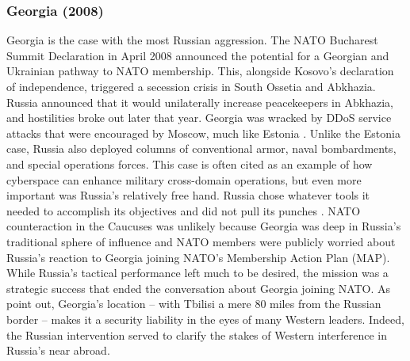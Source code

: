 \documentclass[11pt,letterpaper,pdftex,dvipsnames,table]{article}
\begin{document}
\subsubsection{Georgia (2008)}
Georgia is the case with the most Russian aggression. The NATO Bucharest Summit Declaration in April 2008 announced the potential for a Georgian and Ukrainian pathway to NATO membership. This, alongside Kosovo's declaration of independence, triggered a secession crisis in South Ossetia and Abkhazia. Russia announced that it would unilaterally increase peacekeepers in Abkhazia, and hostilities broke out later that year. Georgia was wracked by DDoS service attacks that were encouraged by Moscow, much like Estonia \citep{deibert_cyclonescyberspaceinformation_2012}. Unlike the Estonia case, Russia also deployed columns of conventional armor, naval bombardments, and special operations forces. This case is often cited as an example of how cyberspace can enhance military cross-domain operations, but even more important was Russia's relatively free hand. Russia chose whatever tools it needed to accomplish its objectives and did not pull its punches \citep{binnendijk_understandingrussianblack_2020}. NATO counteraction in the Caucuses was unlikely because Georgia was deep in Russia's traditional sphere of influence and NATO members were publicly worried about Russia's reaction to Georgia joining NATO's Membership Action Plan (MAP). While Russia’s tactical performance left much to be desired, the mission was a strategic success that ended the conversation about Georgia joining NATO. As \citet[590]{driscoll_friendsthesebrinkmanship_2016} point out, Georgia's location -- with Tbilisi a mere 80 miles from the Russian border -- makes it a security liability in the eyes of many Western leaders. Indeed, the Russian intervention served to clarify the stakes of Western interference in Russia's near abroad.
\end{document}
